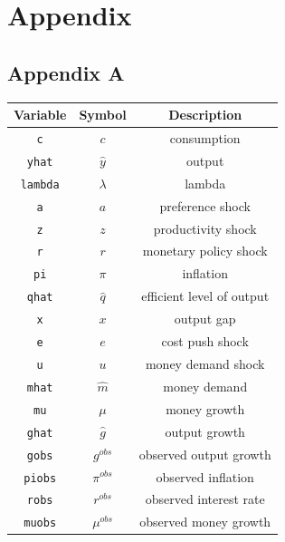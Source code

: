 \documentclass[11pt,preprint, authoryear]{elsarticle}
\let\origtable\table
\let\endorigtable\endtable
\renewenvironment{table}[1][2] {
    \expandafter\origtable\expandafter[H]
} {
    \endorigtable
}
\numberwithin{equation}{section}
\numberwithin{figure}{section}
\numberwithin{table}{section}
\begin{document}
\hypertarget{appendix}{%
\section*{Appendix}\label{appendix}}

\hypertarget{appendix-a}{%
\subsection*{Appendix A}\label{appendix-a}}

\begin{table}
\caption{Endogenous Variables}
 \label{Table:end}
 \begin{center}
\begin{tabular}{|c|c|c|} 
\hline
  Variable & Symbol & Description \\ 
\hline
\texttt{c} & ${c}$ & consumption\\
\texttt{yhat} & ${\hat y}$ & output\\
\texttt{lambda} & ${\lambda}$ & lambda\\
\texttt{a} & ${a}$ & preference shock\\
\texttt{z} & ${z}$ & productivity shock\\
\texttt{r} & ${r}$ & monetary policy shock\\
\texttt{pi} & ${\pi}$ & inflation\\
\texttt{qhat} & ${\hat q}$ & efficient level of output\\
\texttt{x} & ${x}$ & output gap\\
\texttt{e} & ${e}$ & cost push shock\\
\texttt{u} & ${u}$ & money demand shock\\
\texttt{mhat} & ${\hat m}$ & money demand\\
\texttt{mu} & ${\mu}$ & money growth\\
\texttt{ghat} & ${\hat g}$ & output growth\\
\texttt{gobs} & ${g^{obs}}$ & observed output growth\\
\texttt{piobs} & ${\pi^{obs}}$ & observed inflation\\
\texttt{robs} & ${r^{obs}}$ & observed interest rate\\
\texttt{muobs} & ${\mu^{obs}}$ & observed money growth\\
\hline
\end{tabular}
\end{center}
\end{table}
\end{document}

